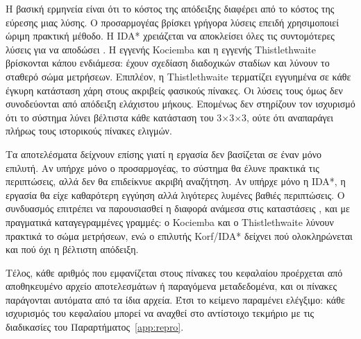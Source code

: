 Η βασική ερμηνεία είναι ότι το κόστος της απόδειξης διαφέρει από το κόστος της εύρεσης μιας λύσης. Ο προσαρμογέας βρίσκει γρήγορα λύσεις επειδή χρησιμοποιεί ώριμη πρακτική μέθοδο. Η IDA* χρειάζεται να αποκλείσει όλες τις συντομότερες λύσεις για να αποδώσει . Η εγγενής Kociemba και η εγγενής Thistlethwaite βρίσκονται κάπου ενδιάμεσα: έχουν σχεδίαση διαδοχικών σταδίων και λύνουν το σταθερό σώμα μετρήσεων. Επιπλέον, η Thistlethwaite τερματίζει εγγυημένα σε κάθε έγκυρη κατάσταση χάρη στους ακριβείς φασικούς πίνακες. Οι λύσεις τους όμως δεν συνοδεύονται από απόδειξη ελάχιστου μήκους. Επομένως δεν στηρίζουν τον ισχυρισμό ότι το σύστημα λύνει βέλτιστα κάθε κατάσταση του 3×3×3, ούτε ότι αναπαράγει πλήρως τους ιστορικούς πίνακες ελιγμών.

Τα αποτελέσματα δείχνουν επίσης γιατί η εργασία δεν βασίζεται σε έναν μόνο επιλυτή. Αν υπήρχε μόνο ο προσαρμογέας, το σύστημα θα έλυνε πρακτικά τις περιπτώσεις, αλλά δεν θα επιδείκνυε ακριβή αναζήτηση. Αν υπήρχε μόνο η IDA*, η εργασία θα είχε καθαρότερη εγγύηση αλλά λιγότερες λυμένες βαθιές περιπτώσεις. Ο συνδυασμός επιτρέπει να παρουσιασθεί η διαφορά ανάμεσα στις καταστάσεις ,  και  με πραγματικά καταγεγραμμένες γραμμές: ο Kociemba και ο Thistlethwaite λύνουν πρακτικά το σώμα μετρήσεων, ενώ ο επιλυτής Korf/IDA* δείχνει πού ολοκληρώνεται και πού όχι η βέλτιστη απόδειξη.

Τέλος, κάθε αριθμός που εμφανίζεται στους πίνακες του κεφαλαίου προέρχεται από αποθηκευμένο αρχείο αποτελεσμάτων ή παραγόμενα μεταδεδομένα, και οι πίνακες παράγονται αυτόματα από τα ίδια αρχεία. Έτσι το κείμενο παραμένει ελέγξιμο: κάθε ισχυρισμός του κεφαλαίου μπορεί να αναχθεί στο αντίστοιχο τεκμήριο με τις διαδικασίες του Παραρτήματος~\ref{app:repro}.
